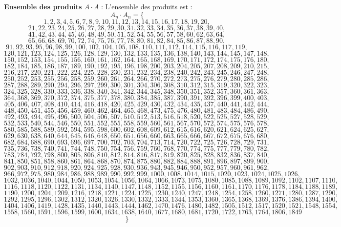 \documentclass[11pt,a4paper]{article}
\begin{document}
\textbf{Ensemble des produits $A \cdot A$} :
L'ensemble des produits est :
$$ A_{{{n}}} \cdot A_{{{n}}} = \{ $$$$ 1, 2, 3, 4, 5, 6, 7, 8, 9, 10, 11, 12, 13, 14, 15, 16, 17, 18, 19, 20, $$$$ 21, 22, 23, 24, 25, 26, 27, 28, 29, 30, 31, 32, 33, 34, 35, 36, 37, 38, 39, 40, $$$$ 41, 42, 43, 44, 45, 46, 48, 49, 50, 51, 52, 54, 55, 56, 57, 58, 60, 62, 63, 64, $$$$ 65, 66, 68, 69, 70, 72, 74, 75, 76, 77, 78, 80, 81, 82, 84, 85, 86, 87, 88, 90, $$$$ 91, 92, 93, 95, 96, 98, 99, 100, 102, 104, 105, 108, 110, 111, 112, 114, 115, 116, 117, 119, $$$$ 120, 121, 123, 124, 125, 126, 128, 129, 130, 132, 133, 135, 136, 138, 140, 143, 144, 145, 147, 148, $$$$ 150, 152, 153, 154, 155, 156, 160, 161, 162, 164, 165, 168, 169, 170, 171, 172, 174, 175, 176, 180, $$$$ 182, 184, 185, 186, 187, 189, 190, 192, 195, 196, 198, 200, 203, 204, 205, 207, 208, 209, 210, 215, $$$$ 216, 217, 220, 221, 222, 224, 225, 228, 230, 231, 232, 234, 238, 240, 242, 243, 245, 246, 247, 248, $$$$ 250, 252, 253, 255, 256, 258, 259, 260, 261, 264, 266, 270, 272, 273, 275, 276, 279, 280, 285, 286, $$$$ 287, 288, 289, 290, 294, 296, 297, 299, 300, 301, 304, 306, 308, 310, 312, 315, 319, 320, 322, 323, $$$$ 324, 325, 328, 330, 333, 336, 338, 340, 341, 342, 344, 345, 348, 350, 351, 352, 357, 360, 361, 363, $$$$ 364, 368, 369, 370, 372, 374, 375, 377, 378, 380, 384, 385, 387, 390, 391, 392, 396, 399, 400, 403, $$$$ 405, 406, 407, 408, 410, 414, 416, 418, 420, 425, 429, 430, 432, 434, 435, 437, 440, 441, 442, 444, $$$$ 448, 450, 451, 455, 456, 459, 460, 462, 464, 465, 468, 473, 475, 476, 480, 481, 483, 484, 486, 490, $$$$ 492, 493, 494, 495, 496, 500, 504, 506, 507, 510, 512, 513, 516, 518, 520, 522, 525, 527, 528, 529, $$$$ 532, 533, 540, 544, 546, 550, 551, 552, 555, 558, 559, 560, 561, 567, 570, 572, 574, 575, 576, 578, $$$$ 580, 585, 588, 589, 592, 594, 595, 598, 600, 602, 608, 609, 612, 615, 616, 620, 621, 624, 625, 627, $$$$ 629, 630, 638, 640, 644, 645, 646, 648, 650, 651, 656, 660, 663, 665, 666, 667, 672, 675, 676, 680, $$$$ 682, 684, 688, 690, 693, 696, 697, 700, 702, 703, 704, 713, 714, 720, 722, 725, 726, 728, 729, 731, $$$$ 735, 736, 738, 740, 741, 744, 748, 750, 754, 756, 759, 760, 768, 770, 774, 775, 777, 779, 780, 782, $$$$ 783, 784, 792, 798, 800, 805, 806, 810, 812, 814, 816, 817, 819, 820, 825, 828, 832, 836, 837, 840, $$$$ 841, 850, 851, 858, 860, 861, 864, 868, 870, 874, 875, 880, 882, 884, 888, 891, 896, 897, 899, 900, $$$$ 902, 903, 910, 912, 918, 920, 924, 925, 928, 930, 936, 943, 945, 946, 950, 952, 957, 960, 961, 962, $$$$ 966, 972, 975, 980, 984, 986, 988, 989, 990, 992, 999, 1000, 1008, 1014, 1015, 1020, 1023, 1024, 1025, 1026, $$$$ 1032, 1036, 1040, 1044, 1050, 1053, 1054, 1056, 1064, 1066, 1073, 1075, 1080, 1085, 1088, 1089, 1092, 1102, 1107, 1110, $$$$ 1116, 1118, 1120, 1122, 1131, 1134, 1140, 1147, 1148, 1152, 1155, 1156, 1160, 1161, 1170, 1176, 1178, 1184, 1188, 1189, $$$$ 1190, 1200, 1204, 1209, 1216, 1218, 1221, 1224, 1225, 1230, 1240, 1247, 1248, 1254, 1258, 1260, 1271, 1280, 1287, 1290, $$$$ 1292, 1295, 1296, 1302, 1312, 1320, 1326, 1330, 1332, 1333, 1344, 1353, 1360, 1365, 1368, 1369, 1376, 1386, 1394, 1400, $$$$ 1404, 1406, 1419, 1428, 1435, 1440, 1443, 1444, 1462, 1470, 1476, 1480, 1482, 1505, 1512, 1517, 1520, 1521, 1548, 1554, $$$$ 1558, 1560, 1591, 1596, 1599, 1600, 1634, 1638, 1640, 1677, 1680, 1681, 1720, 1722, 1763, 1764, 1806, 1849 $$$$ \} $$
\end{document}
